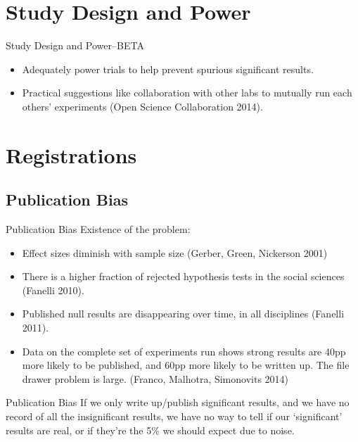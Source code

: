 \documentclass{beamer}
\begin{document}
\section{Study Design and Power}
\begin{frame}{Study Design and Power--BETA}
\begin{itemize}
\item
Adequately power trials to help prevent spurious significant results. 
\item
Practical suggestions like collaboration with other labs to mutually run each others' experiments (Open Science Collaboration 2014).
\end{itemize}
\end{frame}

\section{Registrations}

\subsection*{Publication Bias}
\begin{frame}{Publication Bias}%
  Existence of the problem:
  \begin{itemize}[<.->]
  \item
 Effect sizes diminish with sample size (Gerber, Green, Nickerson 2001)
  \item
  There is a higher fraction of rejected hypothesis tests in the social sciences (Fanelli 2010).
  \item
  	Published null results are disappearing over time, in all disciplines (Fanelli 2011). 
  \item
  	Data on the complete set of experiments run shows strong results are 40pp more likely to be published, and 60pp more likely to be written up. The file drawer problem is large. (Franco, Malhotra, Simonovits 2014)
  \end{itemize}
\end{frame}

\begin {frame}{Publication Bias}
If we only write up/publish significant results, and we have no record of all the insignificant results, we have no way to tell if our `significant' results are real, or if they're the 5\% we should expect due to noise.
\end{frame}
\end{document}

